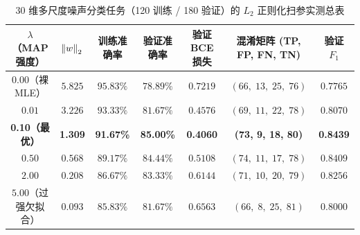 \begin{table}[htbp]
\centering
\caption{30 维多尺度噪声分类任务（120 训练 / 180 验证）的 $L_2$ 正则化扫参实测总表}
\label{tab:ch6-l2-sweep}
\footnotesize
\begin{tabular}{@{}ccccccc@{}}
\toprule
\textbf{$\lambda$（MAP 强度）} & \textbf{$\left\|w\right\|_2$} & \textbf{训练准确率} & \textbf{验证准确率} & \textbf{验证 BCE 损失} & \textbf{混淆矩阵 (TP, FP, FN, TN)} & \textbf{验证 $F_1$} \\
\midrule
$0.00$（裸 MLE） & $5.825$ & $95.83\%$ & $78.89\%$ & $0.7219$ & $(66,\; 13,\; 25,\; 76)$ & $0.7765$ \\
$0.01$ & $3.226$ & $93.33\%$ & $81.67\%$ & $0.4576$ & $(69,\; 11,\; 22,\; 78)$ & $0.8070$ \\
\textbf{\color{teal}0.10（最优）} & \textbf{\color{teal}1.309} & \textbf{\color{teal}91.67\%} & \textbf{\color{teal}85.00\%} & \textbf{\color{teal}0.4060} & \textbf{\color{teal}(73, 9, 18, 80)} & \textbf{\color{teal}0.8439} \\
$0.50$ & $0.568$ & $89.17\%$ & $84.44\%$ & $0.5108$ & $(74,\; 11,\; 17,\; 78)$ & $0.8409$ \\
$2.00$ & $0.208$ & $86.67\%$ & $83.33\%$ & $0.6144$ & $(71,\; 10,\; 20,\; 79)$ & $0.8256$ \\
$5.00$（过强欠拟合） & $0.093$ & $85.83\%$ & $81.67\%$ & $0.6563$ & $(66,\; 8,\; 25,\; 81)$ & $0.8000$ \\
\bottomrule
\end{tabular}
\end{table}

